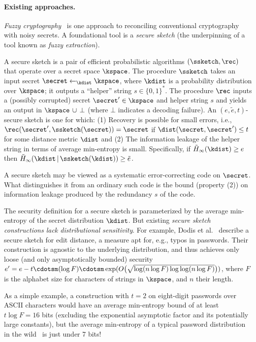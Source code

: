 \paragraph{Existing approaches.} {\em Fuzzy
cryptography}~\cite{Boy04,DKRS06,DORS06,DORS08,FJ01,Juels:2006fk,JuelsWattenberg:1999}
is one approach to reconciling conventional cryptography with noisy secrets. A
foundational tool is a {\em secure sketch} (the underpinning of a tool known as
{\em fuzzy extraction}). 

A secure sketch is a pair of efficient probabilistic algorithms $(\ssketch,
\rec)$ that operate over a secret space $\kspace$. The procedure $\ssketch$
takes an input secret $\secret \leftarrow_{\kdist}\kspace$, where $\kdist$ is a
probability distribution over $\kspace$; it outputs a ``helper'' string $s \in
\{0,1\}^*$. The procedure $\rec$ inputs a (possibly corrupted) secret $\secret'
\in \kspace$ and helper string $s$ and yields an output in $\kspace \,\cup\,
\bot$ (where $\bot$ indicates a decoding failure). An $(e, \tilde{e}, t)$-secure
sketch is one for which: (1) Recovery is possible for small errors, i.e.,
$\rec(\secret', \ssketch(\secret)) = \secret$ if $\dist(\secret, \secret') \leq t$ for some
distance metric $\dist$ and (2) The information leakage of the helper string in
terms of average min-entropy is small. Specifically, if  $\tilde{H}_{\infty}
(\kdist) \geq e$ then $\tilde{H}_{\infty} (\kdist \,|\, \ssketch(\kdist)) \geq
\tilde{e}$.

A secure sketch may be viewed as a systematic error-correcting code on 
$\secret$. What distinguishes it from an ordinary such code is the bound
(property (2)) on information leakage produced by the redundancy $s$ of the
code.

The security definition for a secure sketch is parameterized by the average
min-entropy of the secret distribution $\kdist$. But existing {\em secure sketch
constructions lack distributional sensitivity}. For example, Dodis et
al.~\cite{DORS08} describe a secure sketch for edit distance, a measure apt for,
e.g., typos in passwords. Their construction is agnostic to the underlying
distribution, and thus achieves only loose (and only asymptotically
bounded) security  
$e' = e - t\cdotsm(\log F )\cdotsm\exp(O\big(\sqrt{\log(n \log F) \log \log(n \log F)}\big))$, where $F$ is the alphabet size for characters
of strings in $\kspace$, and $n$ their length. 

As a simple example, a construction with $t=2$ on
eight-digit passwords over ASCII characters would have an average
min-entropy bound of at least $t \log F=16$ bits (excluding the exponential
asymptotic factor and its potentially large constants), but 
the average min-entropy of a typical password distribution in the wild~\cite{Bonneau12,Bonneau12b} is just under 7 bits!

